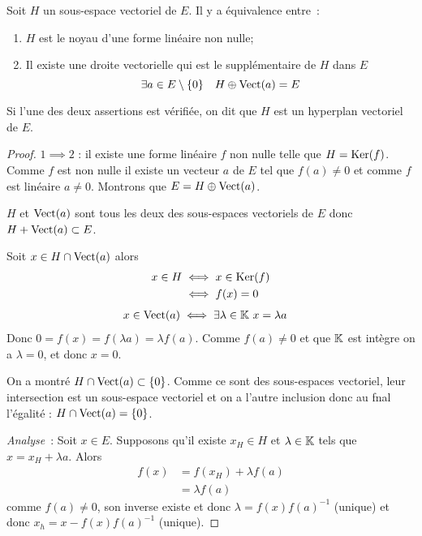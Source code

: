 \begin{prop}
  Soit $H$ un sous-espace vectoriel de $E$. Il y a équivalence entre~:
  \begin{enumerate}
  \item $H$ est le noyau d'une forme linéaire non nulle;
  \item Il existe une droite vectorielle qui est le supplémentaire de $H$ dans $E$
    \begin{equation}
      \exists a \in E\setminus\{0\} \quad H \oplus \operatorname{Vect}(a) = E
    \end{equation}
  \end{enumerate}
  Si l'une des deux assertions est vérifiée, on dit que $H$ est un hyperplan vectoriel de $E$.
\end{prop}
\begin{proof}
  $1 \implies 2$ : il existe une forme linéaire $f$ non nulle telle que $H = \operatorname{Ker}(f)$. Comme $f$ est non nulle il existe un vecteur $a$ de $E$ tel que $f(a) \neq 0$ et comme $f$ est linéaire $a \neq 0$. Montrons que $E= H \oplus \operatorname{Vect}(a)$.

  $H$ et $\operatorname{Vect}(a)$ sont tous les deux des sous-espaces vectoriels de $E$ donc $H + \operatorname{Vect}(a) \subset E$.

  Soit $x \in H \cap \operatorname{Vect}(a)$ alors
  \begin{align}
    x \in H &\iff x \in \operatorname{Ker}(f) \\
    &\iff f(x)=0
  \end{align}
  \begin{align}
    x \in \operatorname{Vect}(a) &\iff \exists \lambda \in \mathbb{K} \ x=\lambda a
  \end{align}
  Donc $0=f(x)=f(\lambda a)=\lambda f(a)$. Comme $f(a) \neq 0$ et que $\mathbb{K}$ est intègre on a $\lambda=0$, et donc $x=0$.

  On a montré $H \cap \operatorname{Vect}(a) \subset \{0\}$. Comme ce sont des sous-espaces vectoriel, leur intersection est un sous-espace vectoriel et on a l'autre inclusion donc au fnal l'égalité : $H \cap \operatorname{Vect}(a) = \{0\}$.

  \emph{Analyse}~: Soit $x \in E$. Supposons qu'il existe $x_H \in H$ et $\lambda \in \mathbb{K}$ tels que $x = x_H + \lambda a$. Alors
  \begin{align}
    f(x) &= f(x_H) +\lambda f(a) \\
    &=\lambda f(a)
  \end{align}
  comme $f(a) \neq 0$, son inverse existe et donc $\lambda = f(x) f(a)^{-1}$ (unique) et donc $x_h = x-f(x) f(a)^{-1}$ (unique).


\end{proof}
